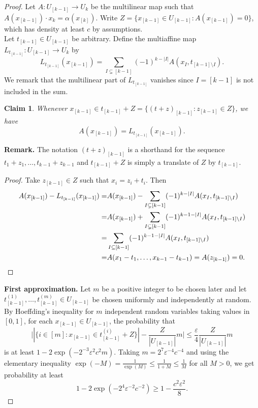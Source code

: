 \documentclass[a4paper,11pt]{article}
\newtheorem{claim}[theorem]{Claim}
\theoremstyle{definition}
\begin{document}
\begin{proof}
    Let $A: U_{[k-1]} \to U_k$ be the multilinear map such that $A(x_{[k-1]}) \cdot x_k = \alpha(x_{[k]})$. Write $Z = \{x_{[k-1]} \in U_{[k-1]} : A(x_{[k-1]}) = 0\}$, which has density at least $c$ by assumptions.\\

    Let $t_{[k-1]} \in U_{[k-1]}$ be arbitrary. Define the multiaffine map $L_{t_{[k-1]}} : U_{[k-1]} \to U_k$ by
    \[L_{t_{[k-1]}}(x_{[k-1]}) = \sum_{I \subsetneq [k-1]} (-1)^{k - |I|} A(x_I, t_{[k-1] \setminus I}).\]
    We remark that the multilinear part of $L_{t_{[k-1]}}$ vanishes since $I = [k-1]$ is not included in the sum.

    \begin{claim}\label{relationLandA}
        Whenever $x_{[k-1]} \in t_{[k-1]} + Z = \{(t+z)_{[k-1]} : z_{[k-1]} \in Z\}$, we have
        \[A(x_{[k-1]}) = L_{t_{[k-1]}}(x_{[k-1]}).\]
    \end{claim}

    \noindent\textbf{Remark.} The notation $(t+z)_{[k-1]}$ is a shorthand for the sequence $t_1 + z_1, \dots, t_{k-1} + z_{k-1}$ and $t_{[k-1]} + Z$ is simply a translate of $Z$ by $t_{[k-1]}$.\\

    \begin{proof}
        Take $z_{[k-1]} \in Z$ such that $x_i  = z_i + t_i$. Then
        \begin{align*}A(x_{[k-1]}) - L_{t_{[k-1]}}(x_{[k-1]}) = &A(x_{[k-1]})- \sum_{I \subsetneq [k-1]} (-1)^{k - |I|} A(x_I, t_{[k-1] \setminus I}) \\
        = &A(x_{[k-1]}) + \sum_{I \subsetneq [k-1]} (-1)^{k - 1 - |I|} A(x_I, t_{[k-1] \setminus I})\\
        = &\sum_{I \subseteq [k-1]} (-1)^{k - 1 - |I|} A(x_I, t_{[k-1] \setminus I})\\
        = &A(x_1 - t_1, \dots, x_{k-1} - t_{k-1}) = A(z_{[k-1]}) = 0.\qedhere\end{align*}
    \end{proof}

    \noindent\textbf{First approximation.} Let $m$ be a positive integer to be chosen later and let $t^{(1)}_{[k-1]}, \dots, t^{(m)}_{[k-1]} \in U_{[k-1]}$ be chosen uniformly and independently at random. By Hoeffding's inequality for $m$ independent random variables taking values in $[0,1]$, for each $x_{[k-1]} \in U_{[k-1]}$, the probability that 
    \begin{equation} \label{prbabilitybound} \Big||\{i \in [m]: x_{[k-1]} \in t^{(i)}_{[k-1]} + Z\}| - \frac{Z}{|U_{[k-1]}|}m\Big| \leq \frac{\varepsilon}{4} \frac{Z}{|U_{[k-1]}|}m \end{equation}
    is at least $1 - 2\exp(- 2^{-3}\varepsilon^2 c^2 m)$. Taking $m = 2^{7}\varepsilon^{-4} c^{-4}$ and using the elementary inequality $\exp(-M) = \frac{1}{\exp(M)} \leq \frac{1}{1 + M}\leq \frac{1}{M}$ for all $M > 0$, we get probability at least
    \[1 - 2\exp(- 2^{4}\varepsilon^{-2} c^{-2}) \geq 1 - \frac{c^2\varepsilon^2}{8}.\]


\end{proof}
\end{document}
